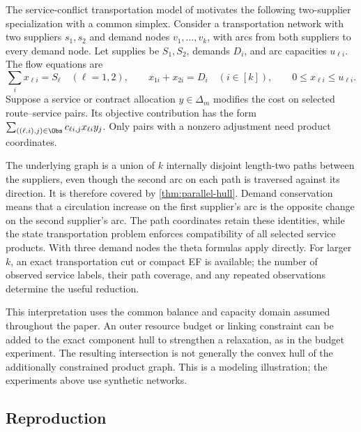 The service-conflict transportation model of
\citet[Section~4.2]{KhademniaDavarnia2025} motivates the following
two-supplier specialization with a common simplex.
Consider a transportation network with two suppliers
$s_1,s_2$ and demand nodes $v_1,\ldots,v_k$, with arcs from both suppliers
to every demand node. Let supplies be $S_1,S_2$, demands $D_i$, and
arc capacities $u_{\ell i}$. The flow equations are
\[
 \sum_i x_{\ell i}=S_\ell\quad(\ell=1,2),\qquad
 x_{1i}+x_{2i}=D_i\quad(i\in[k]),\qquad
 0\le x_{\ell i}\le u_{\ell i}.
\]
Suppose a service or contract allocation $y\in\Delta_m$ modifies the
cost on selected route--service pairs. Its objective contribution has the
form $\sum_{((\ell,i),j)\in\Obs}c_{\ell i,j}x_{\ell i}y_j$.
Only pairs with a nonzero adjustment need product coordinates.

The underlying graph is a union of $k$ internally disjoint length-two
paths between the suppliers, even though the second arc on each path is
traversed against its direction. It is therefore covered by
\cref{thm:parallel-hull}. Demand conservation means that a circulation
increase on the first supplier's arc is the opposite change on the second
supplier's arc. The path coordinates retain these identities, while the
state transportation problem enforces compatibility of all selected service
products. With three demand nodes the theta formulas apply directly.
For larger $k$, an exact transportation cut or compact EF is available;
the number of observed service labels, their path coverage, and any repeated
observations determine the useful reduction.

This interpretation uses the common balance and capacity domain assumed
throughout the paper. An outer resource budget or linking constraint can be
added to the exact component hull to strengthen a relaxation, as in the
budget experiment. The resulting intersection is not generally the convex
hull of the additionally constrained product graph. This is a modeling
illustration; the experiments above use synthetic networks.

\subsection{Reproduction}

